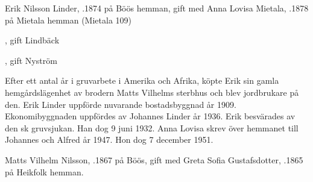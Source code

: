 Erik Nilsson Linder, .1874 på Böös hemman, gift med Anna Lovisa Mietala, .1878 på Mietala hemman (Mietala 109)
\begin{jhchildren}
  \item {}
  \item {}, gift Lindbäck
  \item {}
  \item {}, gift Nyström
  \item {}
  \item {}
  \item {}
  \item {}
  \item {}
\end{jhchildren}

Efter ett antal år i gruvarbete i Amerika och Afrika, köpte  Erik sin gamla hemgårdslägenhet av brodern Matts Vilhelms sterbhus och blev jordbrukare på den. Erik Linder uppförde nuvarande bostadsbyggnad år 1909. Ekonomibyggnaden uppfördes av Johannes Linder år 1936. Erik besvärades  av den sk gruvsjukan. Han  dog 9 juni 1932. Anna Lovisa skrev över hemmanet till Johannes och Alfred år 1947. Hon dog 7 december 1951.


Matts Vilhelm Nilsson, .1867 på Böös, gift med Greta Sofia Gustafsdotter, .1865 på Heikfolk hemman.
\begin{jhchildren}
  \item {}
  \item {}
  \item {}
  \item {}
\end{jhchildren}

